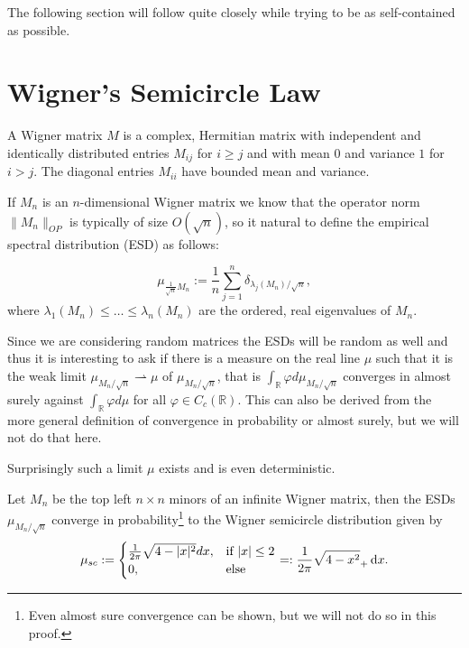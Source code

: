 The following section will follow \cite{TaoWSCL} quite closely while trying to be as self-contained as possible.

\section{Wigner's Semicircle Law}
\begin{definition}
	A Wigner matrix $M$ is a complex, Hermitian matrix with independent and identically distributed entries $M_{ij}$ for $i\geq j$ and with mean $0$ and variance $1$ for $i>j$. The diagonal entries $M_{ii}$ have bounded mean and variance.
\end{definition}


If $M_n$ is an $n$-dimensional Wigner matrix we know that the operator norm $\|M_n\|_{OP}$ is typically of size $O(\sqrt n)$, so it natural to define the empirical spectral distribution (ESD) as follows:

\begin{definition}[ESD]
	\begin{equation*}
		\mu_{\frac{1}{\sqrt{n}}M_n}:=\frac{1}{n}\sum_{j=1}^n \delta_{\lambda_j(M_n)/\sqrt{n}},
	\end{equation*}
	where $\lambda_1(M_n)\leq\dots\leq\lambda_n(M_n)$ are the ordered, real eigenvalues of $M_n$.
\end{definition}

Since we are considering random matrices the ESDs will be random as well and thus it is interesting to ask if there is a measure on the real line $\mu$ such that it is the weak limit $\mu_{M_n/\sqrt{n}}\rightharpoonup\mu$ of $\mu_{M_n/\sqrt{n}}$, that is $\int_\mathbb{R} \varphi d\mu_{M_n/\sqrt{n}}$ converges in almost surely against $\int_\mathbb{R} \varphi d\mu$ for all $\varphi\in C_c(\mathbb R)$. This can also be derived from the more general definition of convergence in probability or almost surely, but we will not do that here.

Surprisingly such a limit $\mu$ exists and is even deterministic.

\begin{theorem}\label{thm:semicircle}
	Let $M_n$ be the top left $n\times n$ minors of an infinite Wigner matrix, then the ESDs $\mu_{M_n/\sqrt{n}}$ converge in probability\footnote{Even almost sure convergence can be shown, but we will not do so in this proof.} to the Wigner semicircle distribution given by
	\begin{equation*}
		\mu_{sc}:=\begin{cases}
						\frac{1}{2\pi}\sqrt{4-|x|^2}dx, &\mbox{if } |x|\leq 2 \\
						0, &\mbox{else}
					  \end{cases}=:\frac{1}{2\pi}\sqrt{4-x^2}_+\mathop{}\!\mathrm{d} x.
	\end{equation*}
\end{theorem}


